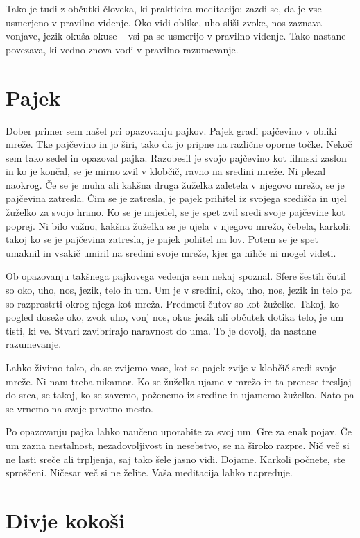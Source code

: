 Tako je tudi z občutki človeka, ki prakticira meditacijo: zazdi se, da je vse usmerjeno v pravilno videnje. Oko vidi oblike, uho sliši zvoke, nos zaznava vonjave, jezik okuša okuse – vsi pa se usmerijo v pravilno videnje. Tako nastane povezava, ki vedno znova vodi v pravilno razumevanje.

\section{Pajek}

Dober primer sem našel pri opazovanju pajkov. Pajek gradi pajčevino v obliki mreže. Tke pajčevino in jo širi, tako da jo pripne na različne oporne točke. Nekoč sem tako sedel in opazoval pajka. Razobesil je svojo pajčevino kot filmski zaslon in ko je končal, se je mirno zvil v klobčič, ravno na sredini mreže. Ni plezal naokrog. Če se je muha ali kakšna druga žuželka zaletela v njegovo mrežo, se je pajčevina zatresla. Čim se je zatresla, je pajek prihitel iz svojega središča in ujel žuželko za svojo hrano. Ko se je najedel, se je spet zvil sredi svoje pajčevine kot poprej. Ni bilo važno, kakšna žuželka se je ujela v njegovo mrežo, čebela, karkoli: takoj ko se je pajčevina zatresla, je pajek pohitel na lov. Potem se je spet umaknil in vsakič umiril na sredini svoje mreže, kjer ga nihče ni mogel videti.

Ob opazovanju takšnega pajkovega vedenja sem nekaj spoznal. Sfere šestih čutil so oko, uho, nos, jezik, telo in um. Um je v sredini, oko, uho, nos, jezik in telo pa so razprostrti okrog njega kot mreža. Predmeti čutov so kot žuželke. Takoj, ko pogled doseže oko, zvok uho, vonj nos, okus jezik ali občutek dotika telo, je um tisti, ki ve. Stvari zavibrirajo naravnost do uma. To je dovolj, da nastane razumevanje.

Lahko živimo tako, da se zvijemo vase, kot se pajek zvije v klobčič sredi svoje mreže. Ni nam treba nikamor. Ko se žuželka ujame v mrežo in ta prenese tresljaj do srca, se takoj, ko se zavemo, poženemo iz sredine in ujamemo žuželko. Nato pa se vrnemo na svoje prvotno mesto.

Po opazovanju pajka lahko naučeno uporabite za svoj um. Gre za enak pojav. Če um zazna nestalnost, nezadovoljivost in nesebstvo, se na široko razpre. Nič več si ne lasti sreče ali trpljenja, saj tako šele jasno vidi. Dojame. Karkoli počnete, ste sproščeni. Ničesar več si ne želite. Vaša meditacija lahko napreduje.

\section{Divje kokoši}

